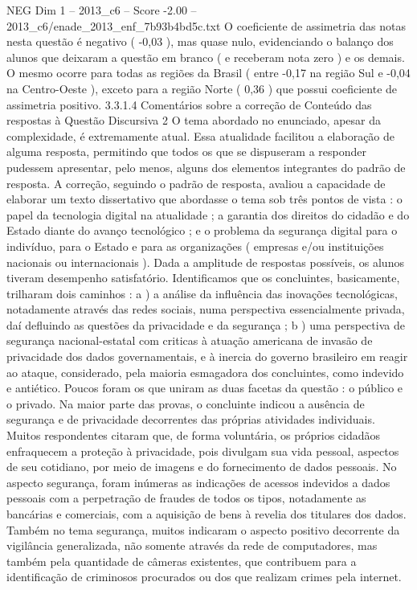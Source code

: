 \begin{textsample}{NEG Dim 1 – 2013\_c6 – Score -2.00 – 2013\_c6/enade\_2013\_enf\_7b93b4bd5c.txt}
O coeficiente de assimetria das notas nesta questão é negativo ( -0,03 ), mas quase nulo, evidenciando o balanço dos alunos que deixaram a questão em branco ( e receberam nota zero ) e os demais.
O mesmo ocorre para todas as regiões da Brasil ( entre -0,17 na região Sul e -0,04 na Centro-Oeste ), exceto para a região Norte ( 0,36 ) que possui coeficiente de assimetria positivo. 3.3.1.4 Comentários sobre a correção de Conteúdo das respostas à Questão Discursiva 2 O tema abordado no enunciado, apesar da complexidade, é extremamente atual.
Essa atualidade facilitou a elaboração de alguma resposta, permitindo que todos os que se dispuseram a responder pudessem apresentar, pelo menos, alguns dos elementos integrantes do padrão de resposta.
A correção, seguindo o padrão de resposta, avaliou a capacidade de elaborar um texto dissertativo que abordasse o tema sob três pontos de vista : o papel da tecnologia digital na atualidade ; a garantia dos direitos do cidadão e do Estado diante do avanço tecnológico ; e o problema da segurança digital para o indivíduo, para o Estado e para as organizações ( empresas e/ou instituições nacionais ou internacionais ).
Dada a amplitude de respostas possíveis, os alunos tiveram desempenho satisfatório.
Identificamos que os concluintes, basicamente, trilharam dois caminhos : a ) a análise da influência das inovações tecnológicas, notadamente através das redes sociais, numa perspectiva essencialmente privada, daí defluindo as questões da privacidade e da segurança ; b ) uma perspectiva de segurança nacional-estatal com criticas à atuação americana de invasão de privacidade dos dados governamentais, e à inercia do governo brasileiro em reagir ao ataque, considerado, pela maioria esmagadora dos concluintes, como indevido e antiético.
Poucos foram os que uniram as duas facetas da questão : o público e o privado.
Na maior parte das provas, o concluinte indicou a ausência de segurança e de privacidade decorrentes das próprias atividades individuais.
Muitos respondentes citaram que, de forma voluntária, os próprios cidadãos enfraquecem a proteção à privacidade, pois divulgam sua vida pessoal, aspectos de seu cotidiano, por meio de imagens e do fornecimento de dados pessoais.
No aspecto segurança, foram inúmeras as indicações de acessos indevidos a dados pessoais com a perpetração de fraudes de todos os tipos, notadamente as bancárias e comerciais, com a aquisição de bens à revelia dos titulares dos dados.
Também no tema segurança, muitos indicaram o aspecto positivo decorrente da vigilância generalizada, não somente através da rede de computadores, mas também pela quantidade de câmeras existentes, que contribuem para a identificação de criminosos procurados ou dos que realizam crimes pela internet.

\end{textsample}
